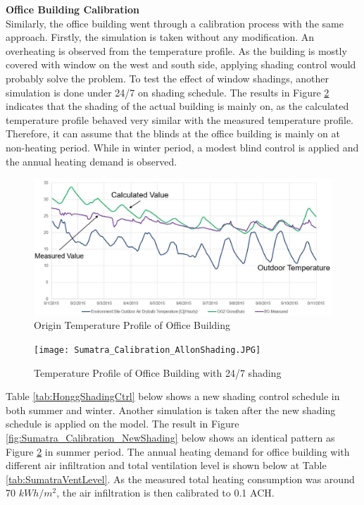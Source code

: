 			\textbf{Office Building Calibration}\\
			Similarly, the office building went through a calibration process with the same approach. Firstly, the simulation is taken without any modification. An overheating is observed from the temperature profile. As the building is mostly covered with window on the west and south side, applying shading control would probably solve the problem. To test the effect of window shadings, another simulation is done under 24/7  on shading schedule. The results in Figure \ref{fig:Sumatra_Calibration_Allshade} indicates that the shading of the actual building is mainly on, as the calculated temperature profile behaved very similar with the measured temperature profile. Therefore, it can assume that the blinds at the office building is mainly on at non-heating period. While in winter period, a modest blind control is applied and the annual heating demand is observed.

			\begin{figure}[H]
			\centering
			\includegraphics[scale=0.35]{Figure/Office_Calibration_Ori.JPG}
			\caption{Origin Temperature Profile of Office Building}
			\label{fig:Sumatra_Calibration_Ori}
			\end{figure}
			
			\begin{figure}[h!]
			\centering
			\texttt{[image: Sumatra\_Calibration\_AllonShading.JPG]}
			\caption{Temperature Profile of Office Building with 24/7 shading}
			\label{fig:Sumatra_Calibration_Allshade}
			\end{figure}			
			
			Table \ref{tab:HonggShadingCtrl} below shows a new shading control schedule in both summer and winter. Another simulation is taken after the new shading schedule is applied on the model. The result in Figure \ref{fig:Sumatra_Calibration_NewShading} below shows an identical pattern as Figure \ref{fig:Sumatra_Calibration_Allshade} in summer period. The annual heating demand for office building with different air infiltration and total ventilation level is shown below at Table \ref{tab:SumatraVentLevel}. As the measured total heating consumption was around 70 $kWh/m^2$, the air infiltration is then calibrated to 0.1 ACH.\\
			
